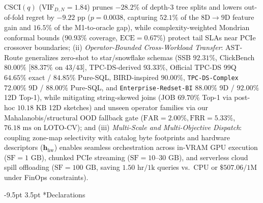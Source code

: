 \documentclass[10pt,a4paper]{article}
\makeatletter
\renewcommand\section{\@startsection{section}{1}{\z@}%
  {-9.5pt \@plus -2pt \@minus -1.5pt}%
  {3.5pt \@plus 1pt}%
  {\normalfont\large\bfseries}}
\makeatother
\begin{document}
$\text{CSCI}(q)$ ($\text{VIF}_{D,N}=1.84$) prunes $-28.2\%$ of depth-3 tree splits and lowers out-of-fold regret by $-9.22\text{ pp}$ ($p=0.0038$, capturing $52.1\%$ of the $8\text{D}\rightarrow 9\text{D}$ feature gain and $16.5\%$ of the M1-to-oracle gap), while complexity-weighted Mondrian conformal bounds ($90.93\%$ coverage, $\text{ECE}=0.67\%$) protect tail SLAs near PCIe crossover boundaries; (ii) \textit{Operator-Bounded Cross-Workload Transfer}: AST-Route generalizes zero-shot to star/snowflake schemas (SSB $92.31\%$, ClickBench $80.00\%$ [$88.37\%$ on $43/43$], TPC-DS-derived $93.33\%$, Official TPC-DS 99Q $64.65\%$ exact / $84.85\%$ Pure-SQL, BIRD-inspired $90.00\%$, \texttt{TPC-DS-Complex} $72.00\%$ 9D / $88.00\%$ Pure-SQL, and \texttt{Enterprise-Redset-BI} $88.00\%$ 9D / $92.00\%$ 12D Top-1), while mitigating string-skewed joins (JOB $69.70\%$ Top-1 via post-hoc $10.18\text{ KB}$ 12D sketches) and unseen operator families via our Mahalanobis/structural OOD fallback gate ($\text{FAR}=2.00\%, \text{FRR}=5.33\%$, $76.18\text{ ms}$ on LOTO-CV); and (iii) \textit{Multi-Scale and Multi-Objective Dispatch}: coupling zone-map selectivity with catalog byte footprints and hardware descriptors ($\mathbf{h}_{\text{hw}}$) enables seamless orchestration across in-VRAM GPU execution ($\text{SF}=1\text{ GB}$), chunked PCIe streaming ($\text{SF}=10\text{--}30\text{ GB}$), and serverless cloud spill offloading ($\text{SF}=100\text{ GB}$, saving $1.50\text{ hr}/1\text{k}$ queries vs.\ CPU or $\$507.06/1\text{M}$ under FinOps constraints).

\vspace{-8pt}
\section*{Declarations}
\enlargethispage{1.8\baselineskip}
\vspace{-5pt}
\end{document}
